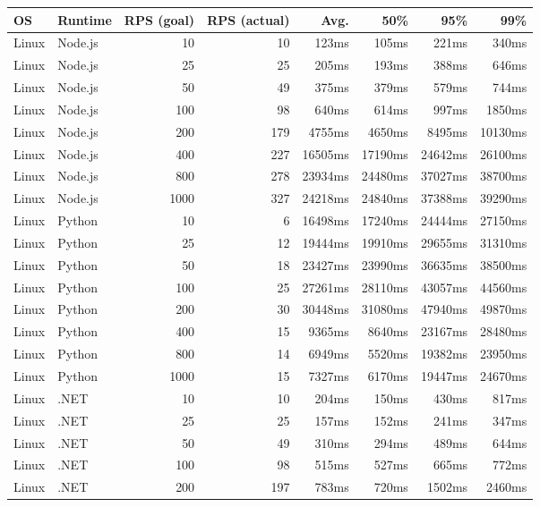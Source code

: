 \begin{table}[h]
    \centering
    \begin{tabular}{|l|l|r|r|r|r|r|r|} \hline
    \textbf{OS} & \textbf{Runtime} & \textbf{RPS (goal)} & \textbf{RPS (actual)} & \textbf{Avg.} & \textbf{50\%} & \textbf{95\%} & \textbf{99\%} \\ \hline
Linux	&	Node.js	&	10	&	10	&	123ms	&	105ms	&	221ms	&	340ms	\\ \hline
Linux	&	Node.js	&	25	&	25	&	205ms	&	193ms	&	388ms	&	646ms	\\ \hline
Linux	&	Node.js	&	50	&	49	&	375ms	&	379ms	&	579ms	&	744ms	\\ \hline
Linux	&	Node.js	&	100	&	98	&	640ms	&	614ms	&	997ms	&	1850ms	\\ \hline
Linux	&	Node.js	&	200	&	179	&	4755ms	&	4650ms	&	8495ms	&	10130ms	\\ \hline
Linux	&	Node.js	&	400	&	227	&	16505ms	&	17190ms	&	24642ms	&	26100ms	\\ \hline
Linux	&	Node.js	&	800	&	278	&	23934ms	&	24480ms	&	37027ms	&	38700ms	\\ \hline
Linux	&	Node.js	&	1000	&	327	&	24218ms	&	24840ms	&	37388ms	&	39290ms	\\ \hline
Linux	&	Python	&	10	&	6	&	16498ms	&	17240ms	&	24444ms	&	27150ms	\\ \hline
Linux	&	Python	&	25	&	12	&	19444ms	&	19910ms	&	29655ms	&	31310ms	\\ \hline
Linux	&	Python	&	50	&	18	&	23427ms	&	23990ms	&	36635ms	&	38500ms	\\ \hline
Linux	&	Python	&	100	&	25	&	27261ms	&	28110ms	&	43057ms	&	44560ms	\\ \hline
Linux	&	Python	&	200	&	30	&	30448ms	&	31080ms	&	47940ms	&	49870ms	\\ \hline
Linux	&	Python	&	400	&	15	&	9365ms	&	8640ms	&	23167ms	&	28480ms	\\ \hline
Linux	&	Python	&	800	&	14	&	6949ms	&	5520ms	&	19382ms	&	23950ms	\\ \hline
Linux	&	Python	&	1000	&	15	&	7327ms	&	6170ms	&	19447ms	&	24670ms	\\ \hline
Linux	&	.NET	&	10	&	10	&	204ms	&	150ms	&	430ms	&	817ms	\\ \hline
Linux	&	.NET	&	25	&	25	&	157ms	&	152ms	&	241ms	&	347ms	\\ \hline
Linux	&	.NET	&	50	&	49	&	310ms	&	294ms	&	489ms	&	644ms	\\ \hline
Linux	&	.NET	&	100	&	98	&	515ms	&	527ms	&	665ms	&	772ms	\\ \hline
Linux	&	.NET	&	200	&	197	&	783ms	&	720ms	&	1502ms	&	2460ms	\\ \hline

\end{tabular}
\end{table}
